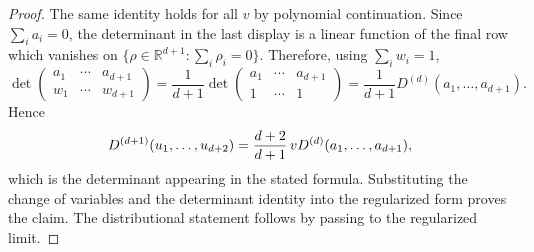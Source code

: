 \begin{proof}
  The same identity holds for all $v$ by polynomial continuation. Since
  $\sum_i a_i = 0$, the determinant in the last display is a linear function
  of the final row which vanishes on $\{\rho \in \mathbb{R}^{d + 1} : \sum_i
  \rho_i = 0\}$. Therefore, using $\sum_i w_i = 1$,
  \[ \det \left( \begin{matrix}
       a_1 & \cdots & a_{d + 1}\\
       w_1 & \cdots & w_{d + 1}
     \end{matrix} \right) = \frac{1}{d + 1} \det \left( \begin{matrix}
       a_1 & \cdots & a_{d + 1}\\
       1 & \cdots & 1
     \end{matrix} \right) = \frac{1}{d + 1} D^{(d)} (a_1, \ldots, a_{d + 1})
     . \]
  Hence
  \[ D^{(d+1)} (u_1, \ldots, u_{d + 2}) = \frac{d + 2}{d + 1}  \hspace{0.17em}
     v  D^{(d)} (a_1, \ldots, a_{d + 1}), \]
  which is the determinant appearing in the stated formula. Substituting the
  change of variables and the determinant identity into the regularized form
  proves the claim. The distributional statement follows by passing to the
  regularized limit.
\end{proof}

